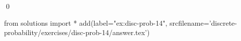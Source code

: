 
\begin{ex} 
  \label{ex:disc-prob-14}
  
  \qed
\end{ex} 
\begin{python0}
from solutions import *
add(label="ex:disc-prob-14",
    srcfilename='discrete-probability/exercises/disc-prob-14/answer.tex') 
\end{python0}
